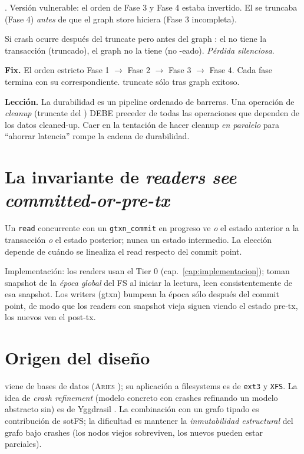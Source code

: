 \begin{trampa}
\label{tr:wal-truncate-early}
. Versión vulnerable: el orden de Fase 3 y Fase 4
estaba invertido. El \wal{} se truncaba (Fase 4) \emph{antes} de que el
graph store hiciera \fsync{} (Fase 3 incompleta).

Si crash ocurre después del \wal{} truncate pero antes del graph
\fsync: el \wal{} no tiene la transacción (truncado), el graph no la
tiene (no \fsync-eado). \emph{Pérdida silenciosa}.

\textbf{Fix.} El orden estricto Fase 1 $\to$ Fase 2 $\to$ Fase 3 $\to$
Fase 4. Cada fase termina con su \fsync{} correspondiente. \wal{}
truncate sólo tras graph \fsync{} exitoso.

\textbf{Lección.} La durabilidad es un pipeline ordenado de barreras.
Una operación de \emph{cleanup} (truncate del \wal) DEBE preceder de
todas las operaciones que dependen de los datos cleaned-up. Caer en la
tentación de hacer cleanup \emph{en paralelo} para ``ahorrar latencia''
rompe la cadena de durabilidad.
\end{trampa}

\section{La invariante de \emph{readers see committed-or-pre-tx}}

\begin{invariante}
\label{inv:read-iso}
Un \texttt{read} concurrente con un \texttt{gtxn\_commit} en progreso ve
\emph{o} el estado anterior a la transacción \emph{o} el estado posterior;
nunca un estado intermedio. La elección depende de cuándo se linealiza el
read respecto del commit point.
\end{invariante}

Implementación: los readers usan el Tier 0 \rcu{}
(cap.~\ref{cap:implementacion}); toman snapshot de la \emph{época
global} del FS al iniciar la lectura, leen consistentemente de esa
snapshot. Los writers (gtxn) bumpean la época sólo después del commit
point, de modo que los readers con snapshot vieja siguen viendo el
estado pre-tx, los nuevos ven el post-tx.

\section{Origen del diseño}

\wal{} viene de bases de datos (\textsc{Aries} \cite{Mohan1992}); su
aplicación a filesystems es de \texttt{ext3} y \texttt{XFS}. La idea de
\emph{crash refinement} (modelo concreto con crashes refinando un modelo
abstracto sin) es de Yggdrasil \cite{Sigurbjarnarson2016}. La
combinación con un grafo tipado es contribución de sotFS; la dificultad
es mantener la \emph{inmutabilidad estructural} del grafo bajo crashes
(los nodos viejos sobreviven, los nuevos pueden estar parciales).

